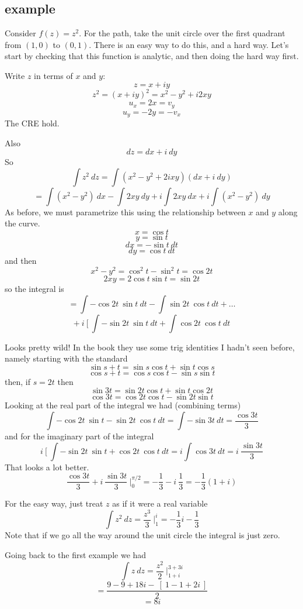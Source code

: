 \documentclass[11pt, oneside]{article}   	%
\begin{document}
\subsection*{example}
Consider $f(z) = z^2$.  For the path, take the unit circle over the first quadrant from $(1,0)$ to $(0,1)$.  There is an easy way to do this, and a hard way.  Let's start by checking that this function is analytic, and then doing the hard way first.

Write $z$ in terms of $x$ and $y$:
\[ z = x + iy \]
\[ z^2 = (x + iy)^2 = x^2 - y^2 + i2xy \]
\[ u_x = 2x = v_y \]
\[ u_y = -2y = -v_x \]
The CRE hold.

Also
\[ dz = dx + i \ dy \]
So
\[ \int z^2 \ dz = \int (x^2 - y^2 + 2ixy) ( dx + i \ dy) \]
\[ = \int (x^2 - y^2) \ dx - \int 2 xy \ dy + i \int 2xy \ dx + i \int (x^2-y^2) \ dy \]
As before, we must parametrize this using the relationship between $x$ and $y$ along the curve.
\[ x = \cos t \]
\[ y = \sin t \]
\[ dx = - \sin t \ dt \]
\[ dy = \cos t \ dt \]
and then
\[ x^2 - y^2 = \cos^2 t - \sin^2 t = \cos 2t \]
\[ 2xy = 2 \cos t \sin t = \sin 2t \]
so the integral is
\[ = \int -\cos 2t \  \sin t \ dt - \int \sin 2t \ \cos t \ dt + \dots \]
\[ + \ i \ [ \ \int - \sin 2t \ \sin t \ dt + \int \cos 2t \ \cos t \ dt \]

Looks pretty wild!  In the book they use some trig identities I hadn't seen before, namely starting with the standard
\[ \sin s + t = \sin s \cos t + \sin t \cos s  \]
\[ \cos s + t = \cos s \cos t - \sin s \sin t \]
then, if $s = 2t$ then
\[ \sin 3t = \sin 2t \cos t + \sin t \cos 2t \]
\[ \cos 3t = \cos 2t \cos t - \sin 2t \sin t \]
Looking at the real part of the integral we had (combining terms)
\[ \int -\cos 2t \  \sin t - \sin 2t \ \cos t \ dt = \int - \sin 3t \ dt = \frac{\cos 3t}{3} \]
and for the imaginary part of the integral
\[ i \ [ \ \int - \sin 2t \ \sin t + \cos 2t \ \cos t \ dt = i \int \cos 3t \ dt = i \ \frac{\sin 3t}{3} \]
That looks a lot better.
\[ \frac{\cos 3t}{3} + i \ \frac{\sin 3t}{3} \ \bigg |_0^{\pi/2} = - \frac{1}{3} - i \ \frac{1}{3} = - \frac{1}{3} (1 + i) \]

For the easy way, just treat $z$ as if it were a real variable
\[ \int z^2 \ dz = \frac{z^3}{3} \ \bigg |_1^i = - \frac{1}{3} i - \frac{1}{3} \]
Note that if we go all the way around the unit circle the integral is just zero.

Going back to the first example we had
\[ \int z \ dz = \frac{z^2}{2} \ \bigg |_{1 + i}^{3 + 3i} \]
\[ = \frac{9 - 9 + 18i - \ [ \ 1 - 1 + 2i \ ] }{2} \]
\[ = 8i \]
\end{document}

